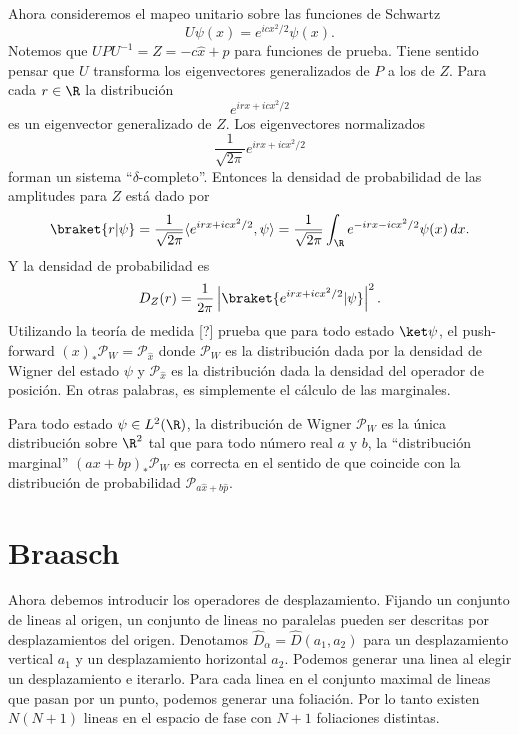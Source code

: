 Ahora consideremos el mapeo unitario sobre las funciones
  de Schwartz
  \[
    U\psi(x) = e^{icx^2 / 2} \psi(x).
  \] 
  Notemos que $UPU^{-1} = Z = -c \hat{x} + \hat{p}$ para
  funciones de prueba. Tiene sentido pensar que $U$ 
  transforma los eigenvectores generalizados de $P$ a los de
  $Z$. Para cada $r \in \R$ la distribución
  \[
    e^{irx + icx^2 / 2}
  \] 
  es un eigenvector generalizado de $Z$. Los eigenvectores
  normalizados
  \[
    \frac{1}{\sqrt{2\pi}} e^{irx + icx^2 / 2}
  \] 
  forman un sistema ``$\delta$-completo''. Entonces la
  densidad de probabilidad de las amplitudes para $Z$ está
  dado por
  \[
    \braket{r|\psi}
    = \frac{1}{\sqrt{2\pi}} \langle e^{irx + i cx^2 / 2},
    \psi \rangle
    = \frac{1}{\sqrt{2\pi}} \int_{\R} e^{-irx-icx^2 /
    2}\psi(x) \, dx.
  \] 
  Y la densidad de probabilidad es
  \[
    D_Z(r)
    = \frac{1}{2\pi} \left|
    \braket{e^{irx+icx^2 / 2}|\psi}
    \right|^2.
  \] 
  Utilizando la teoría de medida [?] prueba que para todo
  estado $\ket \psi$, el push-forward $(x)_* \mathcal P_W =
  \mathcal P_{\hat{x}}$ donde $\mathcal P_W$ es la
  distribución dada por la densidad de Wigner del estado
  $\psi$ y $\mathcal P_{\hat{x}}$ es la distribución dada la
  densidad del operador de posición. En otras palabras, es
  simplemente el cálculo de las marginales.

  \begin{proposition}
    Para todo estado $\psi \in L^2(\R)$, la distribución de
    Wigner $\mathcal P_W$ es la única distribución sobre
    $\R^{2}$ tal que para todo número real $a$ y $b$, la
    ``distribución marginal'' $(ax+bp)_{*} \mathcal P_W$ es
    correcta en el sentido de que coincide con la
    distribución de probabilidad $\mathcal P_{a \hat{x} + b
    \hat{p}}$.
  \end{proposition}


\section{Braasch}


  Ahora debemos introducir los operadores de desplazamiento.
  Fijando un conjunto de lineas al origen, un conjunto de
  lineas no paralelas pueden ser descritas por
  desplazamientos del origen. Denotamos $\hat{D}_\alpha =
  \hat{D}(a_1,a_2)$ para un desplazamiento vertical $a_1$ y
  un desplazamiento horizontal $a_2$. Podemos generar una
  linea al elegir un desplazamiento e iterarlo. Para cada
  linea en el conjunto maximal de lineas que pasan por un
  punto, podemos generar una foliación. Por lo tanto existen
  $N(N+1)$ lineas en el espacio de fase con $N+1$ 
  foliaciones distintas.

